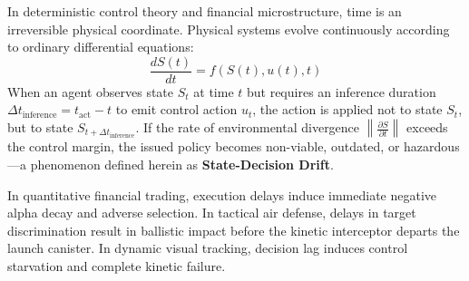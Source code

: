 \documentclass[journal,compsoc]{IEEEtran}
\begin{document}
In deterministic control theory and financial microstructure, time is an irreversible physical coordinate. Physical systems evolve continuously according to ordinary differential equations:
\begin{equation}
\frac{d S(t)}{dt} = f(S(t), u(t), t)
\end{equation}
When an agent observes state $S_t$ at time $t$ but requires an inference duration $\Delta t_{\text{inference}} = t_{\text{act}} - t$ to emit control action $u_t$, the action is applied not to state $S_t$, but to state $S_{t + \Delta t_{\text{inference}}}$. If the rate of environmental divergence $\left\|\frac{\partial S}{\partial t}\right\|$ exceeds the control margin, the issued policy becomes non-viable, outdated, or hazardous---a phenomenon defined herein as \textbf{State-Decision Drift}.

In quantitative financial trading, execution delays induce immediate negative alpha decay and adverse selection. In tactical air defense, delays in target discrimination result in ballistic impact before the kinetic interceptor departs the launch canister. In dynamic visual tracking, decision lag induces control starvation and complete kinetic failure.
\end{document}
